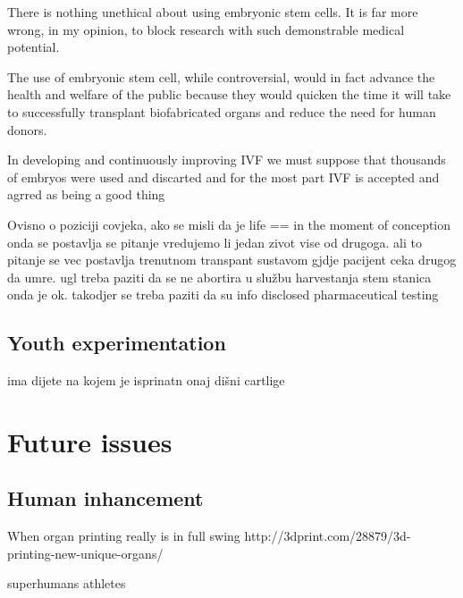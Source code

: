 \documentclass[12pt]{article} %
\begin{document}
There is nothing unethical about using embryonic stem cells. It is far more wrong, in my opinion, to block research with such demonstrable medical potential.

The use of embryonic stem cell, while controversial, would in fact advance the health and welfare of the public because they would quicken the time it will take to successfully transplant biofabricated organs and reduce the need for human donors.



In developing and continuously improving IVF we must suppose that thousands of embryos were used and discarted
 and for the most part IVF is accepted and agrred as being a good thing


Ovisno o poziciji covjeka, ako se misli da je life == in the moment of conception onda se postavlja se pitanje vredujemo li jedan zivot vise od drugoga. ali 
to pitanje se vec postavlja trenutnom transpant sustavom gjdje pacijent ceka drugog da umre. 
ugl treba paziti da se ne abortira u službu harvestanja stem stanica onda je ok.
takodjer se treba paziti da su info disclosed
pharmaceutical testing 

\subsection{Youth experimentation} %
ima dijete na kojem je isprinatn onaj dišni cartlige


\newpage 


\section{Future issues} %

\subsection{Human inhancement} %
When organ printing really is in full swing
http://3dprint.com/28879/3d-printing-new-unique-organs/

superhumans
athletes

\end{document}
